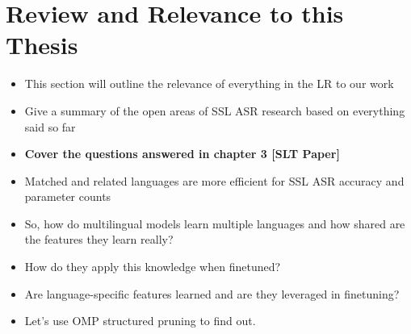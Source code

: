 \section{Review and Relevance to this Thesis}
\begin{itemize}
 \item This section will outline the relevance of everything in the LR to our work
    \item Give a summary of the open areas of SSL ASR research based on everything said so far
    \item \textbf{Cover the questions answered in chapter 3 [SLT Paper]}
    \item Matched and related languages are more efficient for SSL ASR accuracy and parameter counts
    \item So, how do multilingual models learn multiple languages and how shared are the features they learn really?
    \item How do they apply this knowledge when finetuned?
    \item Are language-specific features learned and are they leveraged in finetuning?
    \item Let's use OMP structured pruning to find out.
    

\end{itemize}

